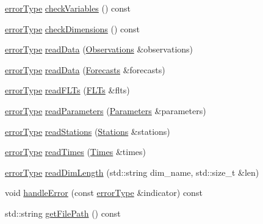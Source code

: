 \begin{DoxyCompactItemize}
\mbox{\hyperlink{class_an_en_i_o_aa56bc1ec6610b86db4349bce20f9ead0}{error\+Type}} \mbox{\hyperlink{class_an_en_i_o_a44347f497bdf775fcf214ec75d8b6470}{check\+Variables}} () const
\item 
\mbox{\hyperlink{class_an_en_i_o_aa56bc1ec6610b86db4349bce20f9ead0}{error\+Type}} \mbox{\hyperlink{class_an_en_i_o_ab6cd06f6402655924002fec4f83195eb}{check\+Dimensions}} () const
\item 
\mbox{\hyperlink{class_an_en_i_o_aa56bc1ec6610b86db4349bce20f9ead0}{error\+Type}} \mbox{\hyperlink{class_an_en_i_o_a84b3e8dcfd3176b4ba20c5ff1b17ee85}{read\+Data}} (\mbox{\hyperlink{class_observations}{Observations}} \&observations)
\item 
\mbox{\hyperlink{class_an_en_i_o_aa56bc1ec6610b86db4349bce20f9ead0}{error\+Type}} \mbox{\hyperlink{class_an_en_i_o_aa00d954aadc03593981748c572010ffd}{read\+Data}} (\mbox{\hyperlink{class_forecasts}{Forecasts}} \&forecasts)
\item 
\mbox{\hyperlink{class_an_en_i_o_aa56bc1ec6610b86db4349bce20f9ead0}{error\+Type}} \mbox{\hyperlink{class_an_en_i_o_a7fdb924e4990c113e2e897310f9ce57c}{read\+F\+L\+Ts}} (\mbox{\hyperlink{class_f_l_ts}{F\+L\+Ts}} \&flts)
\item 
\mbox{\hyperlink{class_an_en_i_o_aa56bc1ec6610b86db4349bce20f9ead0}{error\+Type}} \mbox{\hyperlink{class_an_en_i_o_a909adad6126ab91d304d8bcc46bd5783}{read\+Parameters}} (\mbox{\hyperlink{class_parameters}{Parameters}} \&parameters)
\item 
\mbox{\hyperlink{class_an_en_i_o_aa56bc1ec6610b86db4349bce20f9ead0}{error\+Type}} \mbox{\hyperlink{class_an_en_i_o_a39c40b1ffcd5b12fc8991a0c47346f00}{read\+Stations}} (\mbox{\hyperlink{class_stations}{Stations}} \&stations)
\item 
\mbox{\hyperlink{class_an_en_i_o_aa56bc1ec6610b86db4349bce20f9ead0}{error\+Type}} \mbox{\hyperlink{class_an_en_i_o_a5c513a7a23000ea12419dc7687285612}{read\+Times}} (\mbox{\hyperlink{class_times}{Times}} \&times)
\item 
\mbox{\hyperlink{class_an_en_i_o_aa56bc1ec6610b86db4349bce20f9ead0}{error\+Type}} \mbox{\hyperlink{class_an_en_i_o_a5ca1c7df3da9720967d7ed06f2dfe09b}{read\+Dim\+Length}} (std\+::string dim\+\_\+name, std\+::size\+\_\+t \&len)
\item 
void \mbox{\hyperlink{class_an_en_i_o_a92276aeba9c0b5bd1cd3d285271d505f}{handle\+Error}} (const \mbox{\hyperlink{class_an_en_i_o_aa56bc1ec6610b86db4349bce20f9ead0}{error\+Type}} \&indicator) const
\item 
std\+::string \mbox{\hyperlink{class_an_en_i_o_aae00624f6127c7946496443f5322ec8e}{get\+File\+Path}} () const

\end{DoxyCompactItemize}
